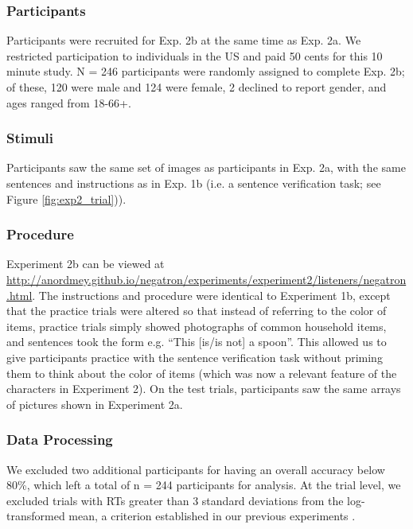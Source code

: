 \documentclass[man, floatsintext, noapacite]{apa6}
\begin{document}
\subsubsection{Participants} 

Participants were recruited for Exp. 2b at the same time as Exp. 2a. We restricted participation to individuals in the US and paid 50 cents for this 10 minute study. N = 246 participants were randomly assigned to complete Exp. 2b; of these, 120 were male and 124 were female, 2 declined to report gender, and ages ranged from 18-66+.

\subsubsection{Stimuli}

Participants saw the same set of images as participants in Exp. 2a, with the same sentences and instructions as in Exp. 1b (i.e. a sentence verification task; see Figure \ref{fig:exp2_trial})).  

\subsubsection{Procedure}

Experiment 2b can be viewed at \url{http://anordmey.github.io/negatron/experiments/experiment2/listeners/negatron.html}. The instructions and procedure were identical to Experiment 1b, except that the practice trials were altered so that instead of referring to the color of items, practice trials simply showed photographs of common household items, and sentences took the form e.g. ``This [is/is not] a spoon''. This allowed us to give participants practice with the sentence verification task without priming them to think about the color of items (which was now a relevant feature of the characters in Experiment 2). On the test trials, participants saw the same arrays of pictures shown in Experiment 2a. 

\subsubsection{Data Processing}

We excluded two additional participants for having an overall accuracy below 80\%, which left a total of n = 244 participants for analysis. At the trial level, we excluded trials with RTs greater than 3 standard deviations from the log-transformed mean, a criterion established in our previous experiments \cite{nordmeyer2014}. 
\end{document}
